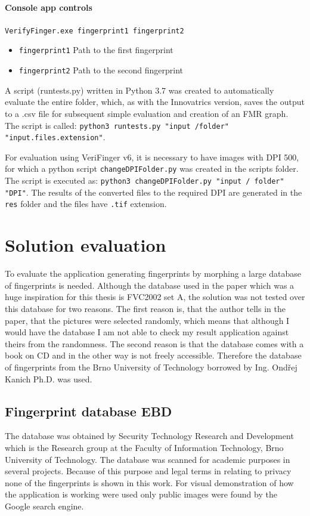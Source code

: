 \subsubsection{Console app controls}
\texttt{VerifyFinger.exe fingerprint1 fingerprint2}
\begin{itemize}
    \item \texttt{fingerprint1} Path to the first fingerprint
    \item \texttt{fingerprint2} Path to the second fingerprint
\end{itemize}

A script (runtests.py) written in Python 3.7 was created to automatically evaluate the entire folder, which, as with the Innovatrics version, saves the output to a .csv file for subsequent simple evaluation and creation of an FMR graph. The script is called: \texttt{python3 runtests.py "input /folder" "input.files.extension"}.

For evaluation using VeriFinger v6, it is necessary to have images with DPI 500, for which a python script \texttt{changeDPIFolder.py} was created in the scripts folder. The script is executed as: \texttt{python3 changeDPIFolder.py "input / folder" "DPI"}. The results of the converted files to the required DPI are generated in the \texttt{res} folder and the files have \texttt{.tif} extension.

\chapter{Solution evaluation}
To evaluate the application generating fingerprints by morphing a large database of fingerprints is needed. Although the database used in the paper which was a huge inspiration for this thesis is FVC2002 set A, the solution was not tested over this database for two reasons. The first reason is, that the author tells in the paper, that the pictures were selected randomly, which means that although I would have the database I am not able to check my result application against theirs from the randomness. The second reason is that the database comes with a book \cite{maltoni2009handbook} on CD and in the other way is not freely accessible. Therefore the database of fingerprints from the Brno University of Technology borrowed by Ing. Ondřej Kanich Ph.D. was used.

\section{Fingerprint database EBD}
The database was obtained by Security Technology Research and Development which is the Research group at the Faculty of Information Technology, Brno University of Technology. The database was scanned for academic purposes in several projects. Because of this purpose and legal terms in relating to privacy none of the fingerprints is shown in this work. For visual demonstration of how the application is working were used only public images were found by the Google search engine.


